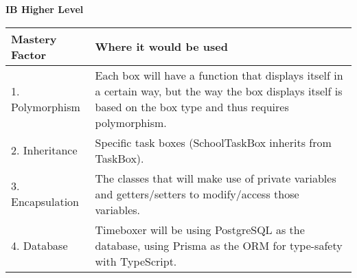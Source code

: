 \documentclass[12pt, notitlepage]{article}
\begin{document}
\bigskip

\noindent\textbf{IB Higher Level}
\smallskip

\noindent\begin{tabularx}{\textwidth}{|l|X|}
	\hline
	\textbf{Mastery Factor}
	 & \textbf{Where it would be used}
	\\\hline
	1. Polymorphism
	 & Each box will have a function that displays itself in a certain way, but the way the box displays itself is based on the box type and thus requires polymorphism.
	\\\hline
	2. Inheritance
	 & Specific task boxes (SchoolTaskBox inherits from TaskBox).
	\\\hline
	3. Encapsulation
	 & The classes that will make use of private variables and getters/setters to modify/access those variables.
	\\\hline
	4. Database
	 & Timeboxer will be using PostgreSQL as the database, using Prisma as the ORM for type-safety with TypeScript.
	\\\hline
\end{tabularx}
\end{document}
